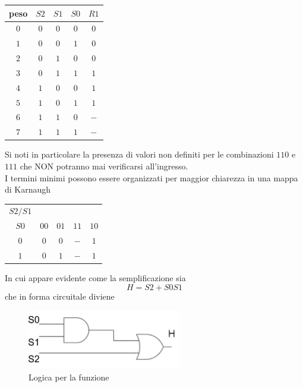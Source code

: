 \documentclass[a4paper]{extarticle}
\renewcommand\arraystretch{}
\begin{document}
\vspace{1em}
\noindent
\begin{table}[H]
\setlength{\tabcolsep}{4pt}
\renewcommand{\arraystretch}{1.2}
\centering
\begin{tabular}{|c|c|c|c|c|}
    \hline
    peso & $S2$ & $S1$ & $S0$ & $R1$\\
    \hline
    $0$ & $0$ & $0$ & $0$ & $0$\\
    $1$ & $0$ & $0$ & $1$ & $0$\\
    $2$ & $0$ & $1$ & $0$ & $0$\\
    $3$ & $0$ & $1$ & $1$ & $1$\\
    $4$ & $1$ & $0$ & $0$ & $1$\\
    $5$ & $1$ & $0$ & $1$ & $1$\\
    $6$ & $1$ & $1$ & $0$ & $-$\\
    $7$ & $1$ & $1$ & $1$ & $-$\\
    \hline
\end{tabular}
\end{table}

\vspace{1em}
\noindent
Si noti in particolare la presenza di valori non definiti per le combinazioni $110$ e $111$ che NON potranno mai verificarsi all'ingresso.\\
I termini minimi possono essere organizzati per maggior chiarezza in una mappa di Karnaugh

\vspace{1em}
\noindent
\begin{table}[H]
\setlength{\tabcolsep}{4pt}
\renewcommand{\arraystretch}{1.2}
\centering
\begin{tabular}{|c|c|c|c|c|}
    \hline
    $S2/S1$ & $ $ & $ $ & $ $ & $ $\\
    $S0$ & $00$ & $01$ & $11$ & $10$\\
    \hline
    $0$ & $0$ & $0$ & $-$ & $1$\\
    \hline
    $1$ & $0$ & $1$ & $-$ & $1$\\
    \hline
\end{tabular}
\end{table}

\vspace{1em}
\noindent
In cui appare evidente come la semplificazione sia
\[H  = S2 + S0S1\]
che in forma circuitale diviene

\begin{figure}[H]
    \centering
    \includegraphics[width=0.6\textwidth]{realizzazione-logica.png}
    \caption{Logica per la funzione}
    \label{fig:logia_funzione}
\end{figure}
\end{document}
